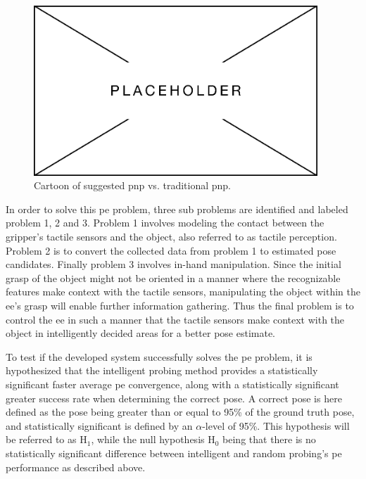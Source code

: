 \begin{figure}[h]
	\begin{small}
		\begin{center}
			\includegraphics[width=0.95\textwidth]{img/placeholder.png}
		\end{center}
		\caption{Cartoon of suggested pnp vs. traditional pnp.}
		\label{fig:cartoon-of-suggested-pnp-vs-traditional-pnp}
	\end{small}
\end{figure}


In order to solve this \gls{pe} problem, three sub problems are identified and labeled problem 1, 2 and 3.
Problem 1 involves modeling the contact between the gripper's tactile sensors and the object, also referred to as tactile perception. 
Problem 2 is to convert the collected data from problem 1 to estimated pose candidates.
Finally problem 3 involves in-hand manipulation. Since the initial grasp of the object might not be oriented in a manner where the recognizable features make context with the tactile sensors, manipulating the object within the \gls{ee}'s grasp will enable further information gathering. Thus the final problem is to control the \gls{ee} in such a manner that the tactile sensors make context with the object in intelligently decided areas for a better pose estimate. \medskip

To test if the developed system successfully solves the \gls{pe} problem, it is hypothesized that the intelligent probing method provides a statistically significant faster average \gls{pe} convergence, along with a statistically significant greater success rate when determining the correct pose. A correct pose is here defined as the pose being greater than or equal to 95\% of the ground truth pose, and statistically significant is defined by an $\alpha$-level of 95\%. This hypothesis will be referred to as $\text{H}_1$, while the null hypothesis $\text{H}_0$ being that there is no statistically significant difference between intelligent and random probing's \gls{pe} performance as described above.

